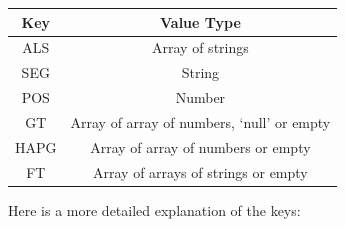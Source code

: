 \begin{longtable}[]{@{}cc@{}}
\toprule
\begin{minipage}[b]{0.16\columnwidth}\centering
Key\strut
\end{minipage} & \begin{minipage}[b]{0.64\columnwidth}\centering
Value Type\strut
\end{minipage}\tabularnewline
\midrule
\endhead
\begin{minipage}[t]{0.16\columnwidth}\centering
ALS\strut
\end{minipage} & \begin{minipage}[t]{0.64\columnwidth}\centering
Array of strings\strut
\end{minipage}\tabularnewline
\begin{minipage}[t]{0.16\columnwidth}\centering
SEG\strut
\end{minipage} & \begin{minipage}[t]{0.64\columnwidth}\centering
String\strut
\end{minipage}\tabularnewline
\begin{minipage}[t]{0.16\columnwidth}\centering
POS\strut
\end{minipage} & \begin{minipage}[t]{0.64\columnwidth}\centering
Number\strut
\end{minipage}\tabularnewline
\begin{minipage}[t]{0.16\columnwidth}\centering
GT\strut
\end{minipage} & \begin{minipage}[t]{0.64\columnwidth}\centering
Array of array of numbers, `null' or empty\strut
\end{minipage}\tabularnewline
\begin{minipage}[t]{0.16\columnwidth}\centering
HAPG\strut
\end{minipage} & \begin{minipage}[t]{0.64\columnwidth}\centering
Array of array of numbers or empty\strut
\end{minipage}\tabularnewline
\begin{minipage}[t]{0.16\columnwidth}\centering
FT\strut
\end{minipage} & \begin{minipage}[t]{0.64\columnwidth}\centering
Array of arrays of strings or empty\strut
\end{minipage}\tabularnewline
\bottomrule
\end{longtable}

Here is a more detailed explanation of the keys:

